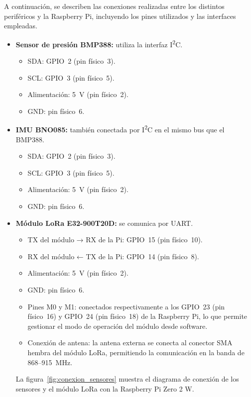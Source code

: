 A continuación, se describen las conexiones realizadas entre los distintos periféricos y la Raspberry Pi, incluyendo los pines utilizados y las interfaces empleadas.

\begin{itemize}
    \item \textbf{Sensor de presión BMP388:} utiliza la interfaz I\textsuperscript{2}C.
    \begin{itemize}
        \item SDA: GPIO~2 (pin físico~3).
        \item SCL: GPIO~3 (pin físico~5).
        \item Alimentación: 5~V (pin físico~2).
        \item GND: pin físico~6.
    \end{itemize}

    \item \textbf{IMU BNO085:} también conectada por I\textsuperscript{2}C en el mismo bus que el BMP388.
    \begin{itemize}
        \item SDA: GPIO~2 (pin físico~3).
        \item SCL: GPIO~3 (pin físico~5).
        \item Alimentación: 5~V (pin físico~2).
        \item GND: pin físico~6.
    \end{itemize}

    \item \textbf{Módulo LoRa E32-900T20D:} se comunica por UART.
    \begin{itemize}
        \item TX del módulo → RX de la Pi: GPIO~15 (pin físico~10).
        \item RX del módulo ← TX de la Pi: GPIO~14 (pin físico~8).
        \item Alimentación: 5~V (pin físico~2).
        \item GND: pin físico~6.
        \item Pines M0 y M1: conectados respectivamente a los GPIO~23 (pin físico~16) y GPIO~24 (pin físico~18) de la Raspberry Pi, lo que permite gestionar el modo de operación del módulo desde software.
        \item Conexión de antena: la antena externa se conecta al conector SMA hembra del módulo LoRa, permitiendo la comunicación en la banda de 868–915~MHz.
    \end{itemize}
    La figura~\ref{fig:conexion_sensores} muestra el diagrama de conexión de los sensores y el módulo LoRa con la Raspberry Pi Zero 2 W.


\end{itemize}
